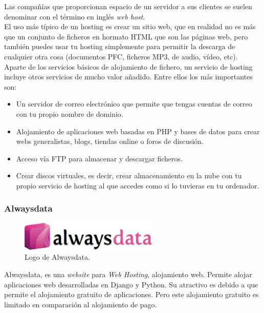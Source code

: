 Las compa\~n\'ias que proporcionan espacio de un servidor a sus clientes se suelen denominar con el t\'ermino en ingl\'es \textit{web host}.\\

El uso m\'as t\'ipico de un hosting es crear un sitio web, que en realidad no es m\'as que un conjunto de ficheros en hormato HTML que son las p\'aginas web, pero tambi\'en puedes usar tu hosting simplemente para permitir la descarga de cualquier otra cosa (documentos PFC, ficheros MP3, de audio, v\'ideo, etc).\\

Aparte de los servicios b\'asicos de alojamiento de fichero, un servicio de hosting incluye otros servicios de mucho valor a\~nadido. Entre ellos los m\'as importantes son:

\begin{itemize}
\item Un servidor de correo electr\'onico que permite que tengas cuentas de correo con tu propio nombre de dominio.
\item Alojamiento de aplicaciones web basadas en PHP y bases de datos para crear webs generalistas, blogs, tiendas online o foros de discusi\'on.
\item Acceso v\'ia FTP para almacenar y descargar ficheros.
\item Crear discos virtuales, es decir, crear almacenamiento en la nube con tu propio servicio de hosting al que accedes como si lo tuvieras en tu ordenador.
\end{itemize}

\subsubsection{Alwaysdata}
\begin{figure}[htbp]
	\centering
	\includegraphics[scale=0.5]{./Figuras/alwaysdatalogo.jpg}
	\caption{Logo de Alwaysdata.}
	\label{fig:alwaysdata}
\end{figure}

Alwaysdata, es una \textit{website} para \textit{Web Hosting}, alojamiento web. Permite alojar aplicaciones web desarrolladas en Django y Python. Su atractivo es debido a que permite el alojamiento gratuito de aplicaciones. Pero este alojamiento gratuito es limitado en comparaci\'on al alojamiento de pago.\\






